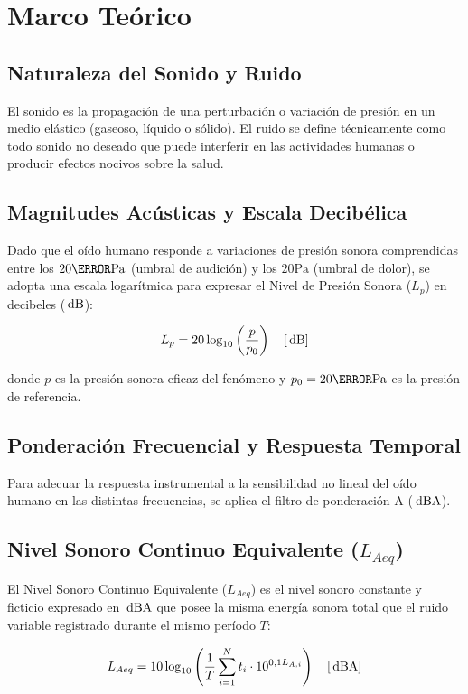 \chapter{Marco Teórico}
\label{sec:teoria}

\section{Naturaleza del Sonido y Ruido}
El sonido es la propagación de una perturbación o variación de presión en un medio elástico (gaseoso,
líquido o sólido). El ruido se define técnicamente como todo sonido no deseado que puede
interferir en las actividades humanas o producir efectos nocivos sobre la salud.

\section{Magnitudes Acústicas y Escala Decibélica}
Dado que el oído humano responde a variaciones de presión sonora comprendidas entre los $20\us\mathrm{Pa}$
(umbral de audición) y los $20\mathrm{Pa}$ (umbral de dolor), se adopta una escala logarítmica para expresar el
Nivel de Presión Sonora ($L_p$) en decibeles ($\,\mathrm{dB}$):

\begin{equation}
\label{eq.ej1:nps}
L_p = 20 \log_{10} \left( \frac{p}{p_0} \right) \quad [\,\mathrm{dB}]
\end{equation}

donde $p$ es la presión sonora eficaz del fenómeno y $p_0 = 20\us\mathrm{Pa}$ es la presión de referencia.

\section{Ponderación Frecuencial y Respuesta Temporal}
Para adecuar la respuesta instrumental a la sensibilidad no lineal del oído humano en las distintas frecuencias,
se aplica el filtro de ponderación A ($\,\mathrm{dBA}$).

\section{Nivel Sonoro Continuo Equivalente ($L_{Aeq}$)}
El Nivel Sonoro Continuo Equivalente ($L_{Aeq}$) es el nivel sonoro constante y ficticio expresado en $\,\mathrm{dBA}$
que posee la misma energía sonora total que el ruido variable registrado durante el mismo período $T$:

\begin{equation}
\label{eq.ej1:laeq}
L_{Aeq} = 10 \log_{10} \left( \frac{1}{T} \sum_{i=1}^{N} t_i \cdot 10^{0,1 L_{A,i}} \right) \quad [\,\mathrm{dBA}]
\end{equation}

